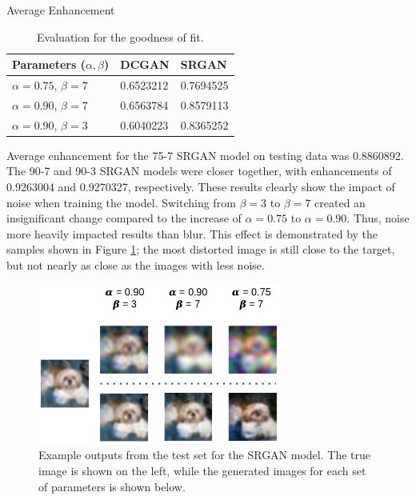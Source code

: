 \documentclass[letterpaper]{article} %
\begin{document}
\begin{table}[t]
\caption*{Average Enhancement}
\begin{centering}
\bgroup
\def\arraystretch{1.5}
\begin{tabular}{| m{} | m{} | m{}|} 
\hline
Parameters ($\alpha,\beta$) & DCGAN & SRGAN \\ 
\hline
\hline
$\alpha = 0.75$, $\beta = 7$ & 0.6523212 & 0.7694525 \\
\hline
$\alpha = 0.90$, $\beta = 7$ & 0.6563784 & 0.8579113 \\
\hline
$\alpha = 0.90$, $\beta = 3$ & 0.6040223 & 0.8365252 \\
\hline
\end{tabular}
\bigskip
\caption{Evaluation for the goodness of fit.}
\label{tbl:enhancement}
\egroup
\end{centering}
\end{table}

Average enhancement for the 75-7 SRGAN model on testing data was 0.8860892.
The 90-7 and 90-3 SRGAN models were closer together, with enhancements of
0.9263004 and 0.9270327, respectively.
These results clearly show the impact of noise when training the model.
Switching from $\beta = 3$ to $\beta = 7$ created an insignificant change
compared to the increase of $\alpha = 0.75$ to $\alpha = 0.90$.
Thus, noise more heavily impacted results than blur.
This effect is demonstrated by the samples shown in Figure \ref{fig:srgan_outputs};
the most distorted image is still close to the target, but not nearly as close as the
images with less noise.

\begin{figure}[htbp]
\centerline{\includegraphics[width=8cm]{srgan_outputs.png}}
\caption{Example outputs from the test set for the SRGAN model.
The true image is shown on the left, while the generated images for each
set of parameters is shown below.}
\label{fig:srgan_outputs}
\end{figure}
\end{document}
